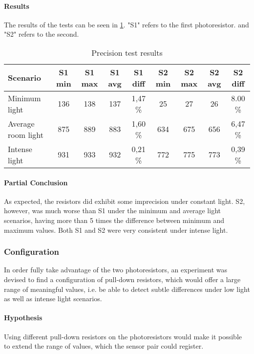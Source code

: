 \paragraph{Results}
The results of the tests can be seen in \cref{tab:precisionTestResults}. "S1" refers to the first photoresistor. and "S2" refers to the second.
\begin{center}
  \begin{table}
    \begin{tabular}[H!]{l c c c c c c c c}
      Scenario & S1 min & S1 max & S1 avg & S1 diff & S2 min & S2 max & S2 avg & S2 diff \\
      \hline
      Minimum light & 136 & 138 & 137 & 1,47 \% & 25 & 27 & 26 & 8.00 \% \\
      Average room light & 875 & 889 & 883 & 1,60 \%  & 634 & 675 & 656 & 6,47 \% \\
      Intense light & 931 & 933 & 932 & 0,21 \%  & 772 & 775 & 773 & 0,39 \% \\
    \end{tabular}
    \label{tab:precisionTestResults}
    \caption{Precision test results}
  \end{table}
\end{center}

\paragraph{Partial Conclusion}
As expected, the resistors did exhibit some imprecision under constant light. S2, however, was much worse than S1 under the minimum and average light scenarios, having more than 5 times the difference between minimum and maximum values. Both S1 and S2 were very consistent under intense light.

\subsubsection{Configuration}
In order fully take advantage of the two photoresistors, an experiment was devised to find a configuration of pull-down resistors, which would offer a large range of meaningful values, i.e. be able to detect subtle differences under low light as well as intense light scenarios.
\paragraph{Hypothesis}
Using different pull-down resistors on the photoresistors would make it possible to extend the range of values, which the sensor pair could register.
